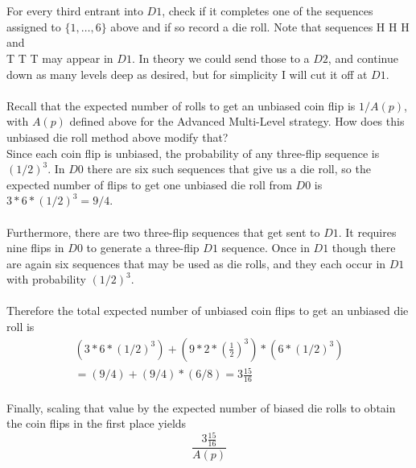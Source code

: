 \documentclass[11pt]{article}
\begin{document}
\begin{itemize}
{\begin{tabular}{l r r r r r r r r}
\end{tabular}
\\
\\
For every third entrant into $D1$, check if it completes one of the sequences assigned to $\{1,\dots,6\}$ above and if so record a die roll. Note that sequences H H H and \\T T T may appear in $D1$. In theory we could send those to a $D2$, and continue down as many levels deep as desired, but for simplicity I will cut it off at $D1$.
\\
\\
Recall that the expected number of rolls to get an unbiased coin flip is $1/A(p)$, with $A(p)$ defined above for the Advanced Multi-Level strategy. How does this unbiased die roll method above modify that?
\\
Since each coin flip is unbiased, the probability of any three-flip sequence is $(1/2)^{3}$. In $D0$ there are six such sequences that give us a die roll, so the expected number of flips to get one unbiased die roll from $D0$ is $3 * 6 * (1/2)^{3} = 9/4$.
\\
\\
Furthermore, there are two three-flip sequences that get sent to $D1$. It requires nine flips in $D0$ to generate a three-flip $D1$ sequence. Once in $D1$ though there are again six sequences that may be used as die rolls, and they each occur in $D1$ with probability $(1/2)^{3}$.
\\
\\
Therefore the total expected number of unbiased coin flips to get an unbiased die roll is
\begin{align*}
(3 * 6 * (1/2)^{3}) + \left ( 9 * 2 * {\left (\frac{1}{2} \right )}^{3} \right ) * (6 * (1/2)^{3}) \\
= (9/4) + (9/4) * (6/8) = 3 \frac{15}{16}
\end{align*}
\\
Finally, scaling that value by the expected number of biased die rolls to obtain the coin flips in the first place yields
\begin{equation*}
\frac {3 \frac{15}{16}}{A(p)}
\end{equation*}
}
\end{itemize}

\newpage
\end{document}
